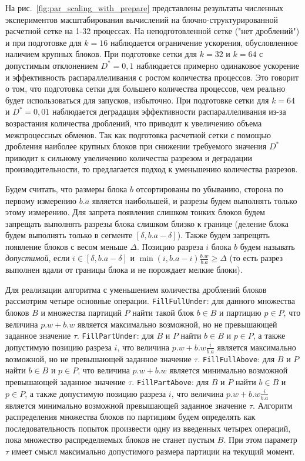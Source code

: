 \documentclass[a4paper,14pt]{extarticle}                     %
\theoremstyle{plain}                                         %
\begin{document}
На рис.~\ref{fig:par_scaling_with_prepare} представлены результаты численных экспериментов масштабирования вычислений на блочно-структурированной расчетной сетке на 1-32 процессах.
На неподготовленной сетке ("нет дроблений") и при подготовке для $k = 16$ наблюдается ограничение ускорения, обусловленное наличием крупных блоков. 
При подготовке сетки для $k = 32$ и $k = 64$ с допустимым отклонением $D^{*} = 0{,}1$ наблюдается примерно одинаковое ускорение и эффективность распараллеливания с ростом количества процессов.
Это говорит о том, что подготовка сетки для большего количества процессов, чем реально будет использоваться для запусков, избыточно.
При подготовке сетки для $k = 64$ и $D^{*} = 0{,}01$ наблюдается деградация эффективности распараллеливания из-за возрастания количества дроблений, что приводит к увеличению объема межпроцессных обменов.
Так как подготовка расчетной сетки с помощью дробления наиболее крупных блоков при снижении требуемого значения $D^{*}$ приводит к сильному увеличению количества разрезом и деградации производительности, то предлагается подход к уменьшению количества разрезов.

Будем считать, что размеры блока $b$ отсортированы по убыванию, сторона по первому измерению $b.a$ является наибольшей, и разрезы будем выполнять только этому измерению.
Для запрета появления слишком тонких блоков будем запрещать выполнять разрезы блока слишком близко к границе (деление блока будем выполнять только в сегменте $[\delta, b.a - \delta]$).
Также будем запрещять появление блоков с весом меньше $\Delta$.
Позицию разреза $i$ блока $b$ будем называть \textit{допустимой}, если $i \in [\delta, b.a - \delta]$ и $\min(i, b.a - i)\frac{b.w}{b.a} \ge \Delta$ (то есть разрез выполнен вдали от границы блока и не порождает мелкие блоки).

Для реализации алгоритма с уменьшением количества дроблений блоков рассмотрим четыре основные операции.
\texttt{FillFullUnder}: для данного множества блоков $B$ и множества партиций $P$ найти такой блок $b \in B$ и партицию $p \in P$, что величина $p.w + b.w$ является максимально возможной, но не превышающей заданное значение $\tau$.
\texttt{FillPartUnder}: для $B$ и $P$ найти $b \in B$ и $p \in P$, а также допустимую позицию разреза $i$, что величина $p.w + b.w \frac{i}{b.a}$ является максимально возможной, но не превышающей заданное значение $\tau$.
\texttt{FillFullAbove}: для $B$ и $P$ найти $b \in B$ и $p \in P$, что величина $p.w + b.w$ является минимально возможной превышающей заданное значение $\tau$.
\texttt{FillPartAbove}: для $B$ и $P$ найти $b \in B$ и $p \in P$, а также допустимую позицию разреза $i$, что величина $p.w + b.w \frac{i}{b.a}$ является минимально возможной превышающей заданное значение $\tau$.
Алгоритм распределения множества блоков по партициям будем определять как последовательность попыток произвести одну из введенных четырех операций, пока множество распределяемых блоков не станет пустым $B$.
При этом параметр $\tau$ имеет смысл максимально допустимого размера партиции на текущий момент.
\end{document}
